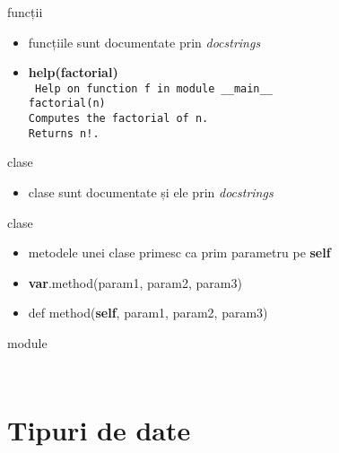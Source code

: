 \documentclass{beamer}
\begin{document}
\begin{frame}{funcții}
  \begin{itemize}
  \item funcțiile sunt documentate prin \textit{docstrings} \\
   \small 
  \item \textbf{help(factorial)}                            \\
    \texttt{
      Help on function f in module \_\_main\_\_\:           \\
      factorial(n)                                          \\
      Computes the factorial of n.                          \\
      Returns n!.
    }
  \end{itemize}
\end{frame}

\begin{frame}{clase}
  \begin{itemize}
  \item clase sunt documentate și ele prin \textit{docstrings} \\
    \small 
  \end{itemize}
\end{frame}

\begin{frame}{clase}
  \begin{itemize}
  \item metodele unei clase primesc ca prim parametru pe \textbf{self}
  \item \textbf{var}.method(param1, param2, param3)
  \item def method(\textbf{self}, param1, param2, param3)
   \end{itemize}
\end{frame}

\begin{frame}{module}
  \begin{columns}[t]
    \begin{column}{4cm}
     \scriptsize {  }
      \end{column}
    \begin{column}{4cm}
      \scriptsize {  }
    \end{column}
  \end{columns}
\end{frame}

\section{Tipuri de date}
\frame{\tableofcontents[currentsection]}
\end{document}
